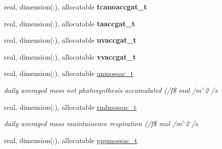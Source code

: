 \begin{DoxyCompactItemize}
\item 
\hypertarget{structctem__statevars_1_1ctem__tile__level_af91872d97d074430fb87657720ef4ce1}{}real, dimension(\+:), allocatable {\bfseries tcanoaccgat\+\_\+t}\label{structctem__statevars_1_1ctem__tile__level_af91872d97d074430fb87657720ef4ce1}

\item 
\hypertarget{structctem__statevars_1_1ctem__tile__level_a80d9c1cb10660fe77ce437e419ff8c51}{}real, dimension(\+:), allocatable {\bfseries taaccgat\+\_\+t}\label{structctem__statevars_1_1ctem__tile__level_a80d9c1cb10660fe77ce437e419ff8c51}

\item 
\hypertarget{structctem__statevars_1_1ctem__tile__level_a3fcc20afde96485bd9ecc377dc3a9e1a}{}real, dimension(\+:), allocatable {\bfseries uvaccgat\+\_\+t}\label{structctem__statevars_1_1ctem__tile__level_a3fcc20afde96485bd9ecc377dc3a9e1a}

\item 
\hypertarget{structctem__statevars_1_1ctem__tile__level_a3637ff4d7a6a8abe646b17f56299e8bd}{}real, dimension(\+:), allocatable {\bfseries vvaccgat\+\_\+t}\label{structctem__statevars_1_1ctem__tile__level_a3637ff4d7a6a8abe646b17f56299e8bd}

\item 
\hypertarget{structctem__statevars_1_1ctem__tile__level_acb08ab5b897a229e59ef256e0a9bce12}{}real, dimension(\+:), allocatable \hyperlink{structctem__statevars_1_1ctem__tile__level_acb08ab5b897a229e59ef256e0a9bce12}{anmossac\+\_\+t}\label{structctem__statevars_1_1ctem__tile__level_acb08ab5b897a229e59ef256e0a9bce12}

\begin{DoxyCompactList}\small\item\em daily averaged moss net photosynthesis accumulated (/f\$ mol /m$^\wedge$2 /s \end{DoxyCompactList}\item 
\hypertarget{structctem__statevars_1_1ctem__tile__level_ab22a62f81687f4ddfa83dcf2bd67a6f5}{}real, dimension(\+:), allocatable \hyperlink{structctem__statevars_1_1ctem__tile__level_ab22a62f81687f4ddfa83dcf2bd67a6f5}{rmlmossac\+\_\+t}\label{structctem__statevars_1_1ctem__tile__level_ab22a62f81687f4ddfa83dcf2bd67a6f5}

\begin{DoxyCompactList}\small\item\em daily averaged moss maintainence respiration (/f\$ mol /m$^\wedge$2 /s \end{DoxyCompactList}\item 
\hypertarget{structctem__statevars_1_1ctem__tile__level_ad0493f7f4e08ae0b8bfb0a5168a3490c}{}real, dimension(\+:), allocatable \hyperlink{structctem__statevars_1_1ctem__tile__level_ad0493f7f4e08ae0b8bfb0a5168a3490c}{gppmossac\+\_\+t}\label{structctem__statevars_1_1ctem__tile__level_ad0493f7f4e08ae0b8bfb0a5168a3490c}


\end{DoxyCompactItemize}
